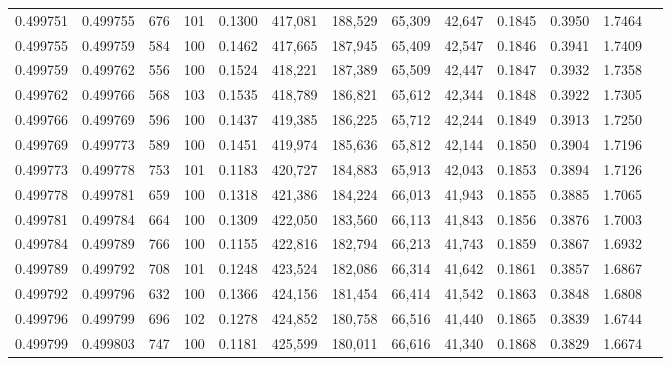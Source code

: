 \begin{tabular}{rrrrrrrrrrrrr}
0.499751 & 0.499755 &   676 & 101 &                                     0.1300 & 417,081 & 188,529 &  65,309 &  42,647 & 0.1845 & 0.3950 & 1.7464 \\
0.499755 & 0.499759 &   584 & 100 &                                     0.1462 & 417,665 & 187,945 &  65,409 &  42,547 & 0.1846 & 0.3941 & 1.7409 \\
0.499759 & 0.499762 &   556 & 100 &                                     0.1524 & 418,221 & 187,389 &  65,509 &  42,447 & 0.1847 & 0.3932 & 1.7358 \\
0.499762 & 0.499766 &   568 & 103 &                                     0.1535 & 418,789 & 186,821 &  65,612 &  42,344 & 0.1848 & 0.3922 & 1.7305 \\
0.499766 & 0.499769 &   596 & 100 &                                     0.1437 & 419,385 & 186,225 &  65,712 &  42,244 & 0.1849 & 0.3913 & 1.7250 \\
0.499769 & 0.499773 &   589 & 100 &                                     0.1451 & 419,974 & 185,636 &  65,812 &  42,144 & 0.1850 & 0.3904 & 1.7196 \\
0.499773 & 0.499778 &   753 & 101 &                                     0.1183 & 420,727 & 184,883 &  65,913 &  42,043 & 0.1853 & 0.3894 & 1.7126 \\
0.499778 & 0.499781 &   659 & 100 &                                     0.1318 & 421,386 & 184,224 &  66,013 &  41,943 & 0.1855 & 0.3885 & 1.7065 \\
0.499781 & 0.499784 &   664 & 100 &                                     0.1309 & 422,050 & 183,560 &  66,113 &  41,843 & 0.1856 & 0.3876 & 1.7003 \\
0.499784 & 0.499789 &   766 & 100 &                                     0.1155 & 422,816 & 182,794 &  66,213 &  41,743 & 0.1859 & 0.3867 & 1.6932 \\
0.499789 & 0.499792 &   708 & 101 &                                     0.1248 & 423,524 & 182,086 &  66,314 &  41,642 & 0.1861 & 0.3857 & 1.6867 \\
0.499792 & 0.499796 &   632 & 100 &                                     0.1366 & 424,156 & 181,454 &  66,414 &  41,542 & 0.1863 & 0.3848 & 1.6808 \\
0.499796 & 0.499799 &   696 & 102 &                                     0.1278 & 424,852 & 180,758 &  66,516 &  41,440 & 0.1865 & 0.3839 & 1.6744 \\
0.499799 & 0.499803 &   747 & 100 &                                     0.1181 & 425,599 & 180,011 &  66,616 &  41,340 & 0.1868 & 0.3829 & 1.6674 \\

\end{tabular}
